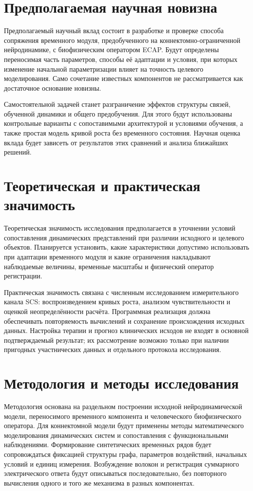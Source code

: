 \section*{Предполагаемая научная новизна}
Предполагаемый научный вклад состоит в разработке и проверке способа сопряжения временного модуля, предобученного на коннектомно-ограниченной нейродинамике, с биофизическим оператором ECAP. Будут определены переносимая часть параметров, способы её адаптации и условия, при которых изменение начальной параметризации влияет на точность целевого моделирования. Само сочетание известных компонентов не рассматривается как достаточное основание новизны.

Самостоятельной задачей станет разграничение эффектов структуры связей, обученной динамики и общего предобучения. Для этого будут использованы контрольные варианты с сопоставимыми архитектурой и условиями обучения, а также простая модель кривой роста без временного состояния. Научная оценка вклада будет зависеть от результатов этих сравнений и анализа ближайших решений.

\section*{Теоретическая и практическая значимость}
Теоретическая значимость исследования предполагается в уточнении условий сопоставления динамических представлений при различии исходного и целевого объектов. Планируется установить, какие характеристики допустимо использовать при адаптации временного модуля и какие ограничения накладывают наблюдаемые величины, временные масштабы и физический оператор регистрации.

Практическая значимость связана с численным исследованием измерительного канала SCS: воспроизведением кривых роста, анализом чувствительности и оценкой неопределённости расчёта. Программная реализация должна обеспечивать повторяемость вычислений и сохранение происхождения исходных данных. Настройка терапии и прогноз клинических исходов не входят в основной подтверждаемый результат; их рассмотрение возможно только при наличии пригодных участнических данных и отдельного протокола исследования.

\section*{Методология и методы исследования}
Методология основана на раздельном построении исходной нейродинамической модели, переносимого временного компонента и человеческого биофизического оператора. Для коннектомной модели будут применены методы математического моделирования динамических систем и сопоставления с функциональными наблюдениями. Формирование синтетических временных рядов будет сопровождаться фиксацией структуры графа, параметров воздействий, начальных условий и единиц измерения. Возбуждение волокон и регистрация суммарного электрического ответа будут описываться последовательно, без повторного вычисления одного и того же механизма в разных компонентах.

